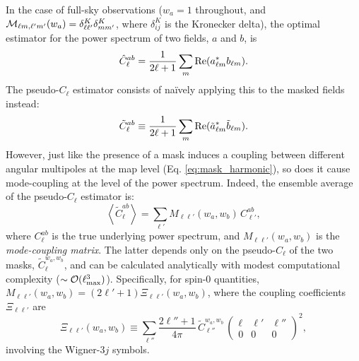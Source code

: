 \documentclass[aps,twocolumn, superscriptaddress, english, nofootinbib, 10pt]{revtex4-2}
\newcommand{\wtj}[6]{\left(\begin{array}{ccc} #1 & #2 & #3\\#4 & #5 & #6\end{array} \right)}
\begin{document}
    In the case of full-sky observations ($w_a=1$ throughout, and ${\cal M}_{\ell m,\ell'm'}(w_a)=\delta^K_{\ell\ell'}\delta^K_{mm'}$, where $\delta^K_{ij}$ is the Kronecker delta), the optimal estimator for the power spectrum of two fields, $a$ and $b$, is
    \begin{equation}
      \hat{C}^{ab}_\ell=\frac{1}{2\ell+1}\sum_m{\rm Re}(a^*_{\ell m}b_{\ell m}).
    \end{equation}
    The pseudo-$C_\ell$ estimator consists of na\"ively applying this to the masked fields instead:
    \begin{equation}\label{eq:pcl_def}
      \tilde{C}^{ab}_\ell\equiv\frac{1}{2\ell+1}\sum_m{\rm Re}(\tilde{a}^*_{\ell m}\tilde{b}_{\ell m}).
    \end{equation}
    However, just like the presence of a mask induces a coupling between different angular multipoles at the map level (Eq. \ref{eq:mask_harmonic}), so does it cause mode-coupling at the level of the power spectrum. Indeed, the ensemble average of the pseudo-$C_\ell$ estimator is:
    \begin{equation}\label{eq:pcl}
      \left\langle \tilde{C}^{ab}_\ell\right\rangle=\sum_{\ell'} M_{\ell\ell'}(w_a,w_b)\,C^{ab}_{\ell'},
    \end{equation}
    where $C^{ab}_\ell$ is the true underlying power spectrum, and $M_{\ell\ell'}(w_a,w_b)$ is the \emph{mode-coupling matrix}. The latter depends only on the pseudo-$C_\ell$ of the two masks, $\tilde{C}^{w_a,w_b}_\ell$, and can be calculated analytically with modest computational complexity ($\sim{\cal O}(\ell_{\rm max}^3)$). Specifically, for spin-0 quantities, $M_{\ell\ell'}(w_a,w_b)=(2\ell'+1)\Xi_{\ell\ell'}(w_a,w_b)$, where the coupling coefficients $\Xi_{\ell\ell'}$ are
    \begin{equation}\label{eq:Xi}
      \Xi_{\ell\ell'}(w_a,w_b)\equiv\sum_{\ell''}\frac{2\ell''+1}{4\pi}\,\tilde{C}^{w_a,w_b}_{\ell''}\,\wtj{\ell}{\ell'}{\ell''}{0}{0}{0}^2,
    \end{equation}
    involving the Wigner-$3j$ symbols.
\end{document}
